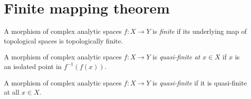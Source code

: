 \section{Finite mapping theorem}

\begin{definition}
    A morphism of complex analytic spaces $f:X\rightarrow Y$ is \emph{finite} if its underlying map of topological spaces is topologically finite.
\end{definition}
\begin{definition}
    A morphism of complex analytic spaces $f:X\rightarrow Y$ is \emph{quasi-finite at $x\in X$} if $x$ is an isolated point in $f^{-1}(f(x))$.

    A morphism of complex analytic spaces $f:X\rightarrow Y$ is \emph{quasi-finite} if it is quasi-finite at all $x\in X$.
\end{definition}

